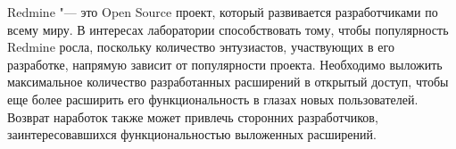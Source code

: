 Redmine "--- это Open Source проект, который развивается разработчиками по
всему миру. В интересах лаборатории способствовать тому, чтобы популярность
Redmine росла, поскольку количество энтузиастов, участвующих в его разработке,
напрямую зависит от популярности проекта. Необходимо  выложить максимальное
количество разработанных расширений в открытый доступ, чтобы еще более
расширить его функциональность в глазах новых пользователей. Возврат наработок
также может привлечь сторонних разработчиков, заинтересовавшихся
функциональностью выложенных расширений.


